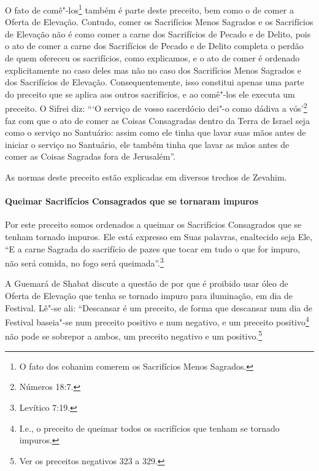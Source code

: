 \begin{multicols}{2}
O fato de comê"-los\footnote{O fato dos cohanim\starr{} comerem os Sacrifícios Menos Sagrados.} também é parte deste preceito,
bem como o de comer a Oferta de Elevação. Contudo, comer os Sacrifícios
Menos Sagrados e os Sacrifícios de Elevação não é como comer a carne dos
Sacrifícios de Pecado e de Delito, pois o ato de comer a carne dos
Sacrifícios de Pecado e de Delito completa o perdão de quem ofereceu os
sacrifícios, como explicamos, e o ato de comer é ordenado explicitamente
no caso deles mas não no caso dos Sacrifícios Menos Sagrados e dos Sacrifícios de Elevação.
Consequentemente, isso constitui apenas uma parte do preceito que se
aplica aos outros sacrifícios, e ao comê"-los ele executa um preceito. O
Sifrei\starr{} diz: ```O serviço de vosso sacerdócio dei"-o como dádiva a vós'\footnote{Números 18:7.} faz com que o ato de comer as Coisas Consagradas dentro
da Terra de Israel seja como o serviço no Santuário: assim como ele
tinha que lavar suas mãos antes de iniciar o serviço no Santuário, ele
também tinha que lavar as mãos antes de comer as Coisas Sagradas fora de
Jerusalém''.

As normas deste preceito estão explicadas em diversos trechos de Zevahim\starr.

\paragraph{Queimar Sacrifícios Consagrados que se tornaram impuros}

Por este preceito somos ordenados a queimar os Sacrifícios Consagrados
que se tenham tornado impuros. Ele está expresso em Suas palavras,
enaltecido seja Ele, ``E a carne Sagrada do sacrifício de pazes que
tocar em tudo o que for impuro, não será comida, no fogo será queimada''.\footnote{Levítico 7:19.}

A Guemará\starr{} de Shabat discute a questão de por que é proibido usar óleo de
Oferta de Elevação que tenha se tornado impuro para iluminação, em dia
de Festival. Lê"-se ali: ``Descansar é um preceito, de forma que
descansar num dia de Festival baseia"-se num preceito positivo e num negativo, e um
preceito positivo\footnote{I.e., o preceito de queimar todos os sacrifícios que tenham se tornado impuros.} não pode se sobrepor a ambos, um
preceito negativo e um positivo.\footnote{Ver os preceitos negativos 323 a 329.}


\end{multicols}
